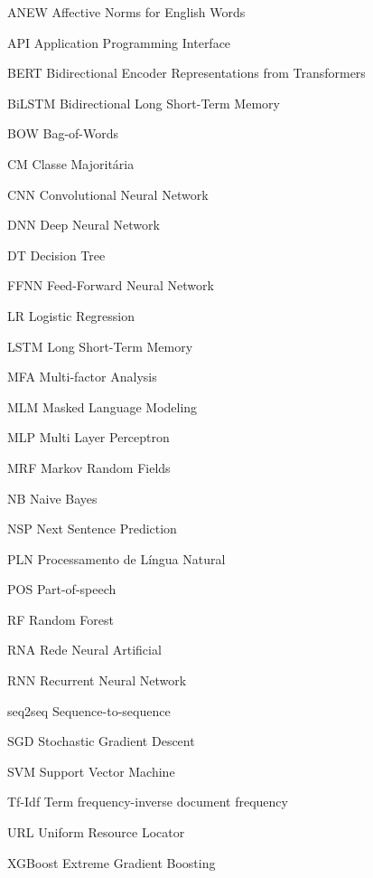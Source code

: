 \documentclass[
	12pt, oneside, a4paper, english, brazil
]{abntex2ppgsi}
\begin{document}
\begin{siglas}
  \item[ANEW] Affective Norms for English Words
  \item[API] Application Programming Interface
  \item[BERT] Bidirectional Encoder Representations from Transformers
  \item[BiLSTM] Bidirectional Long Short-Term Memory
  \item[BOW] Bag-of-Words
  \item[CM] Classe Majoritária
  \item[CNN] Convolutional Neural Network
  \item[DNN] Deep Neural Network
  \item[DT] Decision Tree
  \item[FFNN] Feed-Forward Neural Network
  \item[LR] Logistic Regression
  \item[LSTM] Long Short-Term Memory
  \item[MFA] Multi-factor Analysis
  \item[MLM] Masked Language Modeling
  \item[MLP] Multi Layer Perceptron
  \item[MRF] Markov Random Fields
  \item[NB] Naive Bayes
  \item[NSP] Next Sentence Prediction
  \item[PLN] Processamento de Língua Natural
  \item[POS] Part-of-speech
  \item[RF] Random Forest
  \item[RNA] Rede Neural Artificial
  \item[RNN] Recurrent Neural Network
  \item[seq2seq] Sequence-to-sequence
  \item[SGD] Stochastic Gradient Descent
  \item[SVM] Support Vector Machine
  \item[Tf-Idf] Term frequency-inverse document frequency
  \item[URL] Uniform Resource Locator
  \item[XGBoost] Extreme Gradient Boosting
  
\end{siglas}
\tableofcontents*
\cleardoublepage

\end{document}
